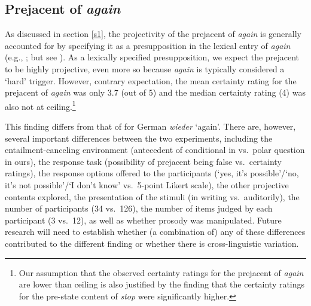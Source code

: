 \documentclass[a4paper,12pt]{article}
\newcommand{\6}{\mbox{$[\hspace*{-.6mm}[$}}
\newcommand{\9}{\mbox{$]\hspace*{-.6mm}]$}}
\begin{document}
\subsection{Prejacent of {\em again}}\label{s42}

As discussed in section \ref{s1}, the projectivity of the prejacent of {\em again} is generally accounted for by specifying it as a presupposition in the lexical entry of {\em again} (e.g., \citealt{kamp-rossdeutscher1994,fabricius-hansen2001,simons01,jaeger-blutner2003,vds-huitink2003,beck2006}; but see \citealt{abrusan2013b,abrusan2016}). As a lexically specified presupposition, we expect the prejacent to be highly projective, even more so because {\em again} is typically considered a `hard' trigger. However, contrary expectation, the mean certainty rating for the prejacent of {\em again} was only 3.7 (out of 5) and the median certainty rating (4) was also not at ceiling.\footnote{Our assumption that the observed certainty ratings for the prejacent of {\em again} are lower than ceiling is also justified by the finding that the certainty ratings for the pre-state content of {\em stop} were significantly higher.}

This finding differs from that of \citealt{xue-onea11} for German {\em wieder} `again'.  There are, however, several important differences between the two experiments, including the entailment-canceling environment (antecedent of conditional in \citealt{xue-onea11}  vs.\ polar question in ours), the response task (possibility of prejacent being false vs.\ certainty ratings), the response options offered to the participants (`yes, it's possible'/`no, it's not possible'/`I don't know' vs.\ 5-point Likert scale), the other projective contents explored, the presentation of the stimuli (in writing vs.\ auditorily), the number of participants (34 vs.\ 126), the number of  items judged by each participant (3 vs.\ 12),  as well as whether prosody was manipulated. Future research will need to establish whether (a combination of) any of these differences contributed to the different finding or whether there is cross-linguistic variation.
 
\end{document}
